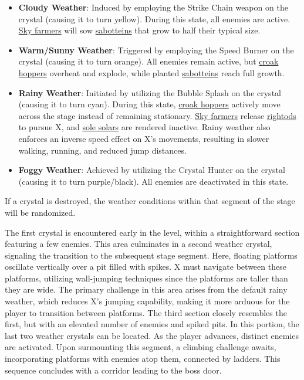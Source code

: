 \begin{itemize}
\item \textbf{Cloudy Weather}: Induced by employing the Strike Chain weapon on the crystal (causing it to turn yellow). During this state, all enemies are active. \hyperlink{enem:Sky_farmer}{Sky farmers} will sow \hyperlink{enem:Sabottein}{sabotteins} that grow to half their typical size.

\item \textbf{Warm/Sunny Weather}: Triggered by employing the Speed Burner on the crystal (causing it to turn orange). All enemies remain active, but \hyperlink{enem:Croak_hopper}{croak hoppers} overheat and explode, while planted \hyperlink{enem:Sabottein}{sabotteins} reach full growth.

\item \textbf{Rainy Weather}: Initiated by utilizing the Bubble Splash on the crystal (causing it to turn cyan). During this state, \hyperlink{enem:Croak_hopper}{croak hoppers} actively move across the stage instead of remaining stationary. \hyperlink{enem:Sky_farmer}{Sky farmers} release \hyperlink{enem:Rightod}{rightods} to pursue X, and \hyperlink{enem:Sole_solar}{sole solars} are rendered inactive. Rainy weather also enforces an inverse speed effect on X's movements, resulting in slower walking, running, and reduced jump distances.

\item \textbf{Foggy Weather}: Achieved by utilizing the Crystal Hunter on the crystal (causing it to turn purple/black). All enemies are deactivated in this state.

\end{itemize}

If a crystal is destroyed, the weather conditions within that segment of the stage will be randomized.

The first crystal is encountered early in the level, within a straightforward section featuring a few enemies. This area culminates in a second weather crystal, signaling the transition to the subsequent stage segment. Here, floating platforms oscillate vertically over a pit filled with spikes. X must navigate between these platforms, utilizing wall-jumping techniques since the platforms are taller than they are wide. The primary challenge in this area arises from the default rainy weather, which reduces X's jumping capability, making it more arduous for the player to transition between platforms. The third section closely resembles the first, but with an elevated number of enemies and spiked pits. In this portion, the last two weather crystals can be located. As the player advances, distinct enemies are activated. Upon surmounting this segment, a climbing challenge awaits, incorporating platforms with enemies atop them, connected by ladders. This sequence concludes with a corridor leading to the boss door.

